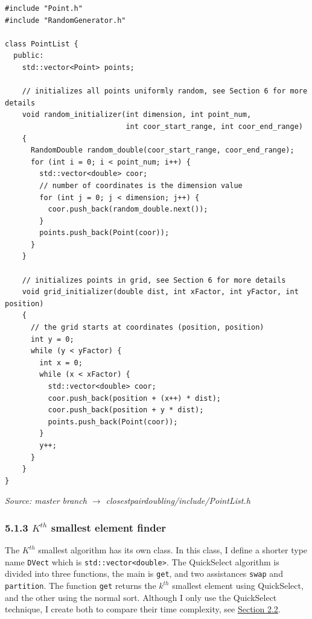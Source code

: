 \documentclass[12pt,english,]{article}
\newcommand{\code}[1]{\colorbox{lbcolor}{\texttt{#1}}}
\begin{document}
\begin{lstlisting}
#include "Point.h"
#include "RandomGenerator.h"

class PointList {
  public:
    std::vector<Point> points;

    // initializes all points uniformly random, see Section 6 for more details 
    void random_initializer(int dimension, int point_num,
                            int coor_start_range, int coor_end_range)
    {
      RandomDouble random_double(coor_start_range, coor_end_range);
      for (int i = 0; i < point_num; i++) {
        std::vector<double> coor;
        // number of coordinates is the dimension value
        for (int j = 0; j < dimension; j++) {
          coor.push_back(random_double.next());
        }
        points.push_back(Point(coor));
      }
    }

    // initializes points in grid, see Section 6 for more details 
    void grid_initializer(double dist, int xFactor, int yFactor, int position)
    {
      // the grid starts at coordinates (position, position)
      int y = 0;
      while (y < yFactor) {
        int x = 0;
        while (x < xFactor) {
          std::vector<double> coor;
          coor.push_back(position + (x++) * dist);
          coor.push_back(position + y * dist);
          points.push_back(Point(coor));
        }
        y++;
      }
    }
}
\end{lstlisting}
\vspace{-2truemm}
\begin{minipage}{1\textwidth}
  \begin{flushright}
  {\footnotesize \emph{Source: master branch $\rightarrow$ closestpairdoubling/include/PointList.h}\par}
  \end{flushright}
\end{minipage}

\hypertarget{section5.1.3}{%
\subsubsection{\texorpdfstring{5.1.3 \(K^{th}\) smallest element
finder}{5.1.3 K\^{}\{th\} smallest element finder}}\label{section5.1.3}}

The \(K^{th}\) smallest algorithm has its own class. In this class, I
define a shorter type name \code{DVect} which is
\code{std::vector<double>}. The QuickSelect algorithm is divided into
three functions, the main is \code{get}, and two assistances \code{swap}
and \code{partition}. The function \code{get} returns the \(k^{th}\)
smallest element using QuickSelect, and the other using the normal sort.
Although I only use the QuickSelect technique, I create both to compare
their time complexity, see \protect\hyperlink{section2.2}{Section 2.2}.
\end{document}
